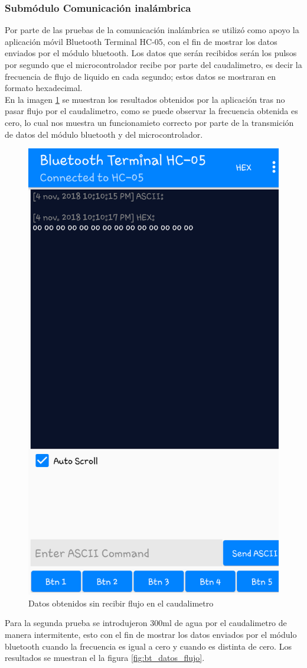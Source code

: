 \subsubsection{Submódulo Comunicación inalámbrica}
Por parte de las pruebas de la comunicación inalámbrica se utilizó como apoyo la aplicación móvil Bluetooth Terminal HC-05, con el fin de mostrar los datos enviados por el módulo bluetooth. 
Los datos que serán recibidos serán los pulsos por segundo que el microcontrolador recibe por parte del caudalimetro, es decir la frecuencia de flujo de liquido en cada segundo; estos datos se mostraran en formato hexadecimal.
\\ En la imagen \ref{fig:bt_datos_ceros} se muestran los resultados obtenidos por la aplicación tras no pasar flujo por el caudalimetro, como se puede observar la frecuencia obtenida es cero, lo cual nos muestra un funcionamieto correcto por parte de la transmición de datos del módulo bluetooth y del microcontrolador.
\begin{figure}[H]
	\centering
	\includegraphics[width=.5\textwidth]{Capitulo6/unitarias/hardware/img/bt_datos_ceros}
	\caption{Datos obtenidos sin recibir flujo en el caudalimetro}
	\label{fig:bt_datos_ceros}
\end{figure}
Para la segunda prueba se introdujeron 300ml de agua por el caudalimetro de manera intermitente, esto con el fin de mostrar los datos enviados por el módulo bluetooth cuando la frecuencia es igual a cero y cuando es distinta de cero. Los resultados se muestran el la figura \ref{fig:bt_datos_flujo}.
